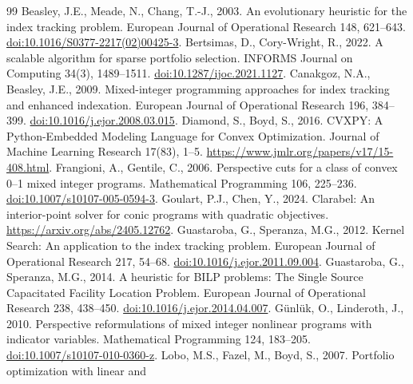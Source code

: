 \documentclass[preprint,12pt,authoryear]{elsarticle}
\begin{document}
\begin{thebibliography}{99}
Beasley, J.E., Meade, N., Chang, T.-J., 2003. An evolutionary heuristic for the
index tracking problem. European Journal of Operational Research 148, 621--643.
\href{https://doi.org/10.1016/S0377-2217(02)00425-3}{doi:10.1016/S0377-2217(02)00425-3}.
Bertsimas, D., Cory-Wright, R., 2022. A scalable algorithm for sparse portfolio
selection. INFORMS Journal on Computing 34(3), 1489--1511.
\href{https://doi.org/10.1287/ijoc.2021.1127}{doi:10.1287/ijoc.2021.1127}.
Canakgoz, N.A., Beasley, J.E., 2009. Mixed-integer programming approaches for
index tracking and enhanced indexation. European Journal of Operational Research
196, 384--399. \href{https://doi.org/10.1016/j.ejor.2008.03.015}{doi:10.1016/j.ejor.2008.03.015}.
Diamond, S., Boyd, S., 2016. CVXPY: A Python-Embedded Modeling Language for
Convex Optimization. Journal of Machine Learning Research 17(83), 1--5.
\url{https://www.jmlr.org/papers/v17/15-408.html}.
Frangioni, A., Gentile, C., 2006. Perspective cuts for a class of convex 0--1
mixed integer programs. Mathematical Programming 106, 225--236.
\href{https://doi.org/10.1007/s10107-005-0594-3}{doi:10.1007/s10107-005-0594-3}.
Goulart, P.J., Chen, Y., 2024. Clarabel: An interior-point solver for conic
programs with quadratic objectives. \url{https://arxiv.org/abs/2405.12762}.
Guastaroba, G., Speranza, M.G., 2012. Kernel Search: An application to the index
tracking problem. European Journal of Operational Research 217, 54--68.
\href{https://doi.org/10.1016/j.ejor.2011.09.004}{doi:10.1016/j.ejor.2011.09.004}.
Guastaroba, G., Speranza, M.G., 2014. A heuristic for BILP problems: The Single
Source Capacitated Facility Location Problem. European Journal of Operational
Research 238, 438--450. \href{https://doi.org/10.1016/j.ejor.2014.04.007}{doi:10.1016/j.ejor.2014.04.007}.
G\"unl\"uk, O., Linderoth, J., 2010. Perspective reformulations of mixed integer
nonlinear programs with indicator variables. Mathematical Programming 124, 183--205.
\href{https://doi.org/10.1007/s10107-010-0360-z}{doi:10.1007/s10107-010-0360-z}.
Lobo, M.S., Fazel, M., Boyd, S., 2007. Portfolio optimization with linear and

\end{thebibliography}
\end{document}
